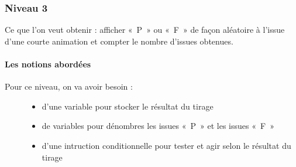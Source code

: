 \documentclass[letterpaper,10pt,french]{sphinxmanual}
\begin{document}
\begin{sphinxVerbatim}[commandchars=\\\{\}]
  \PYG{p}{[}     \PYG{p}{]}   

 
     
                      
        \PYG{p}{[} \PYG{p}{]}
\end{sphinxVerbatim}


\subsubsection{Niveau 3}
\label{\detokenize{decouverte/pileface-python3::doc}}\label{\detokenize{decouverte/pileface-python3:niveau-3}}
Ce que l’on veut obtenir : afficher « P » ou « F » de façon aléatoire à l’issue d’une courte animation et compter le nombre
d’issues obtenues.


\paragraph{Les notions abordées}
\label{\detokenize{decouverte/pileface-python3:les-notions-abordees}}\begin{description}
\item[{Pour ce niveau, on va avoir besoin :}] \leavevmode\begin{itemize}
\item {} 
d’une variable pour stocker le résultat du tirage

\item {} 
de variables pour dénombres les issues « P » et les issues « F »

\item {} 
d’une intruction conditionnelle pour tester et agir selon le résultat du tirage

\end{itemize}

\end{description}
\end{document}
